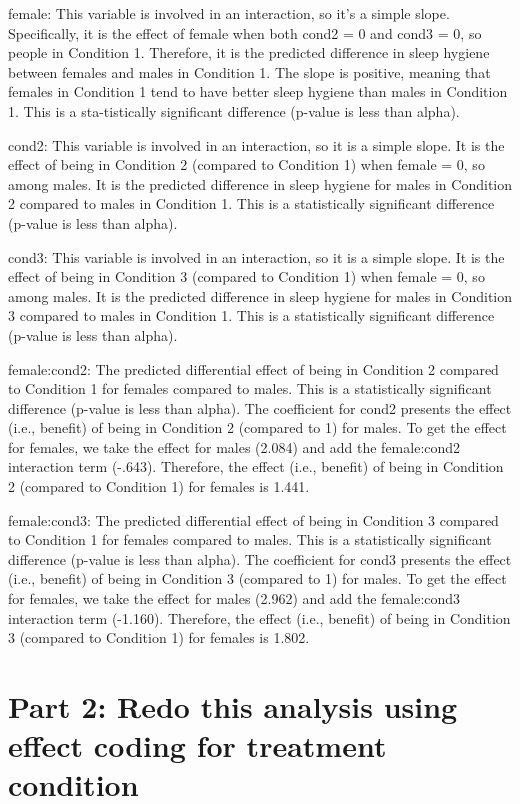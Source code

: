 \documentclass[]{article}
\begin{document}
female: This variable is involved in an interaction, so it's a simple
slope. Specifically, it is the effect of female when both cond2 = 0 and
cond3 = 0, so people in Condition 1. Therefore, it is the predicted
difference in sleep hygiene between females and males in Condition 1.
The slope is positive, meaning that females in Condition 1 tend to have
better sleep hygiene than males in Condition 1. This is a sta-tistically
significant difference (p-value is less than alpha).

cond2: This variable is involved in an interaction, so it is a simple
slope. It is the effect of being in Condition 2 (compared to Condition
1) when female = 0, so among males. It is the predicted difference in
sleep hygiene for males in Condition 2 compared to males in Condition 1.
This is a statistically significant difference (p-value is less than
alpha).

cond3: This variable is involved in an interaction, so it is a simple
slope. It is the effect of being in Condition 3 (compared to Condition
1) when female = 0, so among males. It is the predicted difference in
sleep hygiene for males in Condition 3 compared to males in Condition 1.
This is a statistically significant difference (p-value is less than
alpha).

female:cond2: The predicted differential effect of being in Condition 2
compared to Condition 1 for females compared to males. This is a
statistically significant difference (p-value is less than alpha). The
coefficient for cond2 presents the effect (i.e., benefit) of being in
Condition 2 (compared to 1) for males. To get the effect for females, we
take the effect for males (2.084) and add the female:cond2 interaction
term (-.643). Therefore, the effect (i.e., benefit) of being in
Condition 2 (compared to Condition 1) for females is 1.441.

female:cond3: The predicted differential effect of being in Condition 3
compared to Condition 1 for females compared to males. This is a
statistically significant difference (p-value is less than alpha). The
coefficient for cond3 presents the effect (i.e., benefit) of being in
Condition 3 (compared to 1) for males. To get the effect for females, we
take the effect for males (2.962) and add the female:cond3 interaction
term (-1.160). Therefore, the effect (i.e., benefit) of being in
Condition 3 (compared to Condition 1) for females is 1.802.

\section{Part 2: Redo this analysis using effect coding for treatment
condition}\label{part-2-redo-this-analysis-using-effect-coding-for-treatment-condition}
\end{document}
